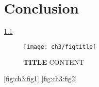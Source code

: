 \chapter{Conclusion}
\label{ch:conclusion}

\ref{fig:ch3:figtitle} 
\begin{figure}[t]
\texttt{[image: ch3/figtitle]}
\caption[SHORT]{\textbf{TITLE} CONTENT}
\label{fig:ch3:figtitle}
\end{figure}


\ref{fig:ch3:fig1} 
\ref{fig:ch3:fig2} 